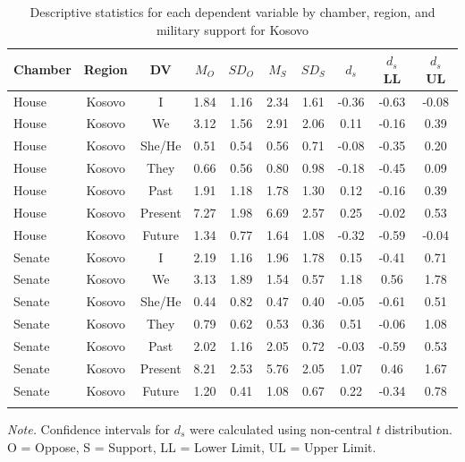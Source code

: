 \documentclass[english,man]{apa6}
\theoremstyle{definition}
\theoremstyle{definition}
\theoremstyle{definition}
\theoremstyle{remark}
\begin{document}
\begin{table}[tbp]
\begin{center}
\begin{threeparttable}
\caption{\label{tab:Ktable}Descriptive statistics for each dependent variable by chamber, 
          region, and military support for Kosovo}
\small{
\begin{tabular}{lccccccccc}
\toprule
Chamber & Region & DV & $M_O$ & $SD_O$ & $M_S$ & $SD_S$ & $d_s$ & $d_s$ LL & $d_s$ UL\\
\midrule
House & Kosovo & I & 1.84 & 1.16 & 2.34 & 1.61 & -0.36 & -0.63 & -0.08\\
House & Kosovo & We & 3.12 & 1.56 & 2.91 & 2.06 & 0.11 & -0.16 & 0.39\\
House & Kosovo & She/He & 0.51 & 0.54 & 0.56 & 0.71 & -0.08 & -0.35 & 0.20\\
House & Kosovo & They & 0.66 & 0.56 & 0.80 & 0.98 & -0.18 & -0.45 & 0.09\\
House & Kosovo & Past & 1.91 & 1.18 & 1.78 & 1.30 & 0.12 & -0.16 & 0.39\\
House & Kosovo & Present & 7.27 & 1.98 & 6.69 & 2.57 & 0.25 & -0.02 & 0.53\\
House & Kosovo & Future & 1.34 & 0.77 & 1.64 & 1.08 & -0.32 & -0.59 & -0.04\\
Senate & Kosovo & I & 2.19 & 1.16 & 1.96 & 1.78 & 0.15 & -0.41 & 0.71\\
Senate & Kosovo & We & 3.13 & 1.89 & 1.54 & 0.57 & 1.18 & 0.56 & 1.78\\
Senate & Kosovo & She/He & 0.44 & 0.82 & 0.47 & 0.40 & -0.05 & -0.61 & 0.51\\
Senate & Kosovo & They & 0.79 & 0.62 & 0.53 & 0.36 & 0.51 & -0.06 & 1.08\\
Senate & Kosovo & Past & 2.02 & 1.16 & 2.05 & 0.72 & -0.03 & -0.59 & 0.53\\
Senate & Kosovo & Present & 8.21 & 2.53 & 5.76 & 2.05 & 1.07 & 0.46 & 1.67\\
Senate & Kosovo & Future & 1.20 & 0.41 & 1.08 & 0.67 & 0.22 & -0.34 & 0.78\\
\bottomrule
\addlinespace
\end{tabular}
}
\begin{tablenotes}[para]
\textit{Note.} Confidence intervals for $d_s$ were calculated using 
          non-central $t$ distribution. O = Oppose, S = Support, LL = Lower Limit, UL = Upper Limit.
\end{tablenotes}
\end{threeparttable}
\end{center}
\end{table}
\end{document}
